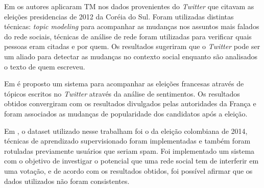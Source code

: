 Em \cite{song2014analyzing} os autores aplicaram \acrshort{TM} nos dados provenientes do \textit{Twitter} que citavam as eleições presidencias de 2012 da Coréia do Sul. 
Foram utilizadas distintas técnicas: \textit{topic modeling} para acompanhar as mudanças nos assuntos mais falados do rede sociais, técnicas de análise de rede 
foram utilizadas para verificar quais pessoas eram citadas e por quem. Os resultados sugeriram que o \textit{Twitter} pode ser um aliado para detectar as mudanças no 
contexto social enquanto são analisados o texto de quem escreveu.


Em  \cite{wegrzyn2012tweets} é proposto um sistema para acompanhar as eleições francesas através de tópicos escritos no \textit{Twitter} através da análise de sentimentos.
Os resultados obtidos convergiram com os resultados divulgados pelas autoridades da França e foram associados as mudanças de popularidade dos candidatos após a eleição.




Em \cite{guzman}, o dataset utilizado nesse trabalham foi o da eleição colombiana de 2014, técnicas de aprendizado supervisionado foram implementadas e também foram rotuladas
previamente usuários que seriam spam. Foi implementado um sistema com o objetivo de investigar o potencial que uma rede social tem de interferir em uma votação, e de acordo com 
os resultados obtidos, foi possível afirmar que os dados utilizados não foram consistentes.


